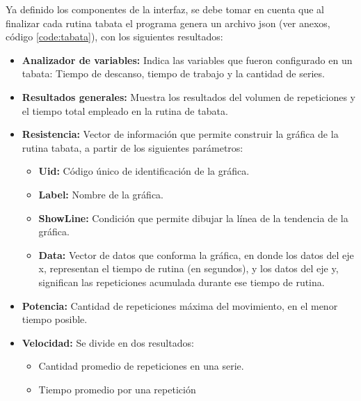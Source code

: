 Ya definido los componentes de la interfaz, se debe tomar en cuenta que al finalizar cada rutina tabata  el programa genera un archivo json (ver anexos, c\'odigo  \ref{code:tabata}), con los siguientes resultados:
\begin{itemize}
	\item \textbf{Analizador de variables:} Indica las variables que fueron configurado en un tabata: Tiempo de descanso, tiempo de trabajo y la cantidad de series.
	\item  \textbf{Resultados generales:} Muestra los resultados del volumen de repeticiones  y el tiempo total empleado en la rutina de tabata.
	\item  \textbf{Resistencia:} Vector de informaci\'on que permite construir la gr\'afica de la rutina tabata, a partir de los siguientes par\'ametros:
	   \begin{itemize}  
   	\item \textbf{Uid:} C\'odigo \'unico de identificaci\'on de la gr\'afica.
   	\item \textbf{Label:} Nombre de la gr\'afica.
   	\item \textbf{ShowLine:} Condici\'on que permite dibujar la l\'inea de la tendencia de la gr\'afica.
    \item \textbf{Data:} Vector de datos que conforma la gr\'afica, en donde los datos del eje x, representan el tiempo de rutina (en segundos), y los datos del eje y, significan las repeticiones acumulada durante ese tiempo de rutina.
   \end{itemize}     
    \item \textbf{Potencia:} Cantidad de repeticiones m\'axima del movimiento, en el menor tiempo posible.
    \item \textbf{Velocidad:} Se divide en dos resultados:
           \begin{itemize}
       \item Cantidad promedio de repeticiones en una serie.
       \item Tiempo promedio por una repetici\'on
       \end{itemize}
\end{itemize} 
